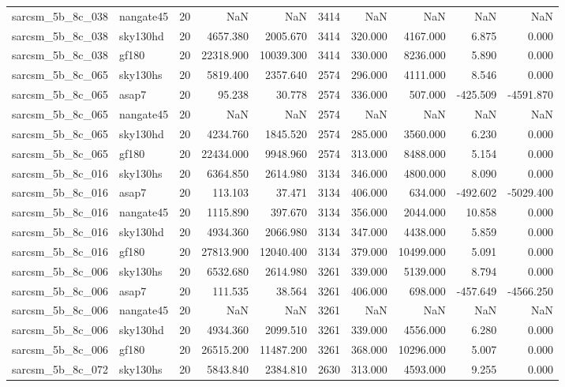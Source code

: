 \begin{longtable}{llrrrrrrrr}
sarcsm\_5b\_8c\_038 & nangate45 & 20 & NaN & NaN & 3414 & NaN & NaN & NaN & NaN \\
sarcsm\_5b\_8c\_038 & sky130hd & 20 & 4657.380 & 2005.670 & 3414 & 320.000 & 4167.000 & 6.875 & 0.000 \\
sarcsm\_5b\_8c\_038 & gf180 & 20 & 22318.900 & 10039.300 & 3414 & 330.000 & 8236.000 & 5.890 & 0.000 \\
sarcsm\_5b\_8c\_065 & sky130hs & 20 & 5819.400 & 2357.640 & 2574 & 296.000 & 4111.000 & 8.546 & 0.000 \\
sarcsm\_5b\_8c\_065 & asap7 & 20 & 95.238 & 30.778 & 2574 & 336.000 & 507.000 & -425.509 & -4591.870 \\
sarcsm\_5b\_8c\_065 & nangate45 & 20 & NaN & NaN & 2574 & NaN & NaN & NaN & NaN \\
sarcsm\_5b\_8c\_065 & sky130hd & 20 & 4234.760 & 1845.520 & 2574 & 285.000 & 3560.000 & 6.230 & 0.000 \\
sarcsm\_5b\_8c\_065 & gf180 & 20 & 22434.000 & 9948.960 & 2574 & 313.000 & 8488.000 & 5.154 & 0.000 \\
sarcsm\_5b\_8c\_016 & sky130hs & 20 & 6364.850 & 2614.980 & 3134 & 346.000 & 4800.000 & 8.090 & 0.000 \\
sarcsm\_5b\_8c\_016 & asap7 & 20 & 113.103 & 37.471 & 3134 & 406.000 & 634.000 & -492.602 & -5029.400 \\
sarcsm\_5b\_8c\_016 & nangate45 & 20 & 1115.890 & 397.670 & 3134 & 356.000 & 2044.000 & 10.858 & 0.000 \\
sarcsm\_5b\_8c\_016 & sky130hd & 20 & 4934.360 & 2066.980 & 3134 & 347.000 & 4438.000 & 5.859 & 0.000 \\
sarcsm\_5b\_8c\_016 & gf180 & 20 & 27813.900 & 12040.400 & 3134 & 379.000 & 10499.000 & 5.091 & 0.000 \\
sarcsm\_5b\_8c\_006 & sky130hs & 20 & 6532.680 & 2614.980 & 3261 & 339.000 & 5139.000 & 8.794 & 0.000 \\
sarcsm\_5b\_8c\_006 & asap7 & 20 & 111.535 & 38.564 & 3261 & 406.000 & 698.000 & -457.649 & -4566.250 \\
sarcsm\_5b\_8c\_006 & nangate45 & 20 & NaN & NaN & 3261 & NaN & NaN & NaN & NaN \\
sarcsm\_5b\_8c\_006 & sky130hd & 20 & 4934.360 & 2099.510 & 3261 & 339.000 & 4556.000 & 6.280 & 0.000 \\
sarcsm\_5b\_8c\_006 & gf180 & 20 & 26515.200 & 11487.200 & 3261 & 368.000 & 10296.000 & 5.007 & 0.000 \\
sarcsm\_5b\_8c\_072 & sky130hs & 20 & 5843.840 & 2384.810 & 2630 & 313.000 & 4593.000 & 9.255 & 0.000 \\

\end{longtable}
